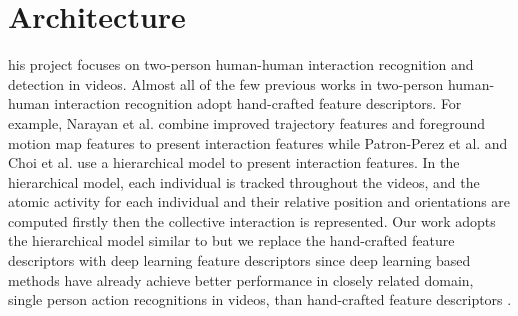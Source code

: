 %
%
\let\textcircled=\pgftextcircled
\chapter{Architecture}
\label{chap3}
his project focuses on two-person human-human interaction recognition and detection in videos. Almost all of the few previous works \cite{patron2010} \cite{narayan2014} \cite{choi2012} in two-person human-human interaction recognition  adopt hand-crafted feature descriptors. For example, Narayan et al. \cite{narayan2014} combine improved trajectory features and foreground motion map features to present interaction features while Patron-Perez et al. \cite{patron2010} and Choi et al. \cite{choi2012} use a hierarchical model to present interaction features. In the hierarchical model,  each individual is tracked throughout the videos, and the atomic activity for each individual and their relative position and orientations are computed firstly then the collective interaction is represented. Our work adopts the hierarchical model similar to \cite{patron2010} but we replace the hand-crafted feature descriptors with deep learning feature descriptors since deep learning based methods \cite{Ji2013} \cite{Tran2015} \cite{simonyan2014} \cite{Ng2015} have already achieve better performance in closely related domain, single person action recognitions in videos, than hand-crafted feature descriptors\cite{grepory2010} \cite{alex2008} \cite{paul2007} \cite{wang2012} \cite{wang2013}. 
    
